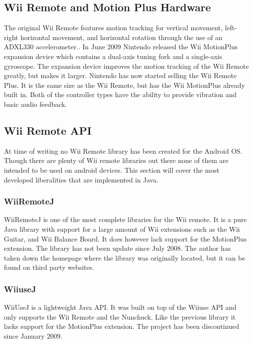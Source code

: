 \documentclass[11pt,twoside,a4paper]{report}
\begin{document}
\subsection{Wii Remote and Motion Plus Hardware}
The original Wii Remote features motion tracking for vertical movement, left-right horizontal movement, and horizontal rotation through the use of an ADXL330 accelerometer.\cite{wiiAccelerometer}.
In June 2009 Nintendo released the Wii MotionPlus expansion device which contains a dual-axis tuning fork and a single-axis gyroscope\cite{wiiMotionPlus}.
The expansion device improves the motion tracking of the Wii Remote greatly, but makes it larger. Nintendo has now started selling the Wii Remote Plus. It is the same size as the Wii Remote, but has the Wii MotionPlus already built in. Both of the controller types have the ability to provide vibration and basic audio feedback.


\subsection{Wii Remote API}
At time of writing no Wii Remote library has been created for the Android OS. Though there are plenty of Wii remote libraries out there none of them are intended to be used on android devices. This section will cover the most developed liberalities that are implemented in Java.

\subsubsection{WiiRemoteJ}
WiiRemoteJ is one of the most complete libraries for the Wii remote. It is a pure Java library with support for a large amount of Wii extensions such as the Wii Guitar, and Wii Balance Board. It does however lack support for the MotionPlus extension. The library has not been update since July 2008. The author has taken down the homepage where the library was originally located, but it can be found on third party websites. \cite{WiiRemoteJ}

\subsubsection{WiiuseJ}
WiiUseJ is a lightweight Java API. It was built on top of the Wiiuse API and only supports the Wii Remote and the Nunchuck. Like the previous library it lacks support for the MotionPlus extension. The project has been discontinued since January 2009. \cite{Wiiusej}
\end{document}
